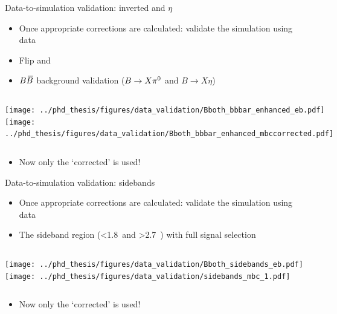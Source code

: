 \documentclass[xcolor=dvipsnames]{beamer}
\begin{document}
\begin{frame}{Data-to-simulation validation: inverted \piz and $\eta$}
   \scriptsize\centering
   \begin{itemize}
      \item Once appropriate corrections are calculated: validate the simulation using data
      \item Flip \piVeto and \etaVeto
      \item[\ra]  $B\kern 0.18em\overline{\kern -0.18em B}{}$ background validation ($B\rightarrow X \pi^0$ and $B\to X \eta$)
   \end{itemize}

   \begin{columns}
      \texttt{[image: ../phd\_thesis/figures/data\_validation/Bboth\_bbbar\_enhanced\_eb.pdf]}
      \texttt{[image: ../phd\_thesis/figures/data\_validation/Bboth\_bbbar\_enhanced\_mbccorrected.pdf]}
   \end{columns}

   \begin{itemize}
      \item Now only the `corrected' \Mbc is used!
   \end{itemize}

\end{frame}

\begin{frame}{Data-to-simulation validation: sidebands}
   \scriptsize\centering
   \begin{itemize}
      \item Once appropriate corrections are calculated: validate the simulation using data
      \item The sideband region (\EB<1.8~\gev and \EB>2.7~\gev) with full signal selection
   \end{itemize}

   \begin{columns}
      \texttt{[image: ../phd\_thesis/figures/data\_validation/Bboth\_sidebands\_eb.pdf]}
      \texttt{[image: ../phd\_thesis/figures/data\_validation/sidebands\_mbc\_1.pdf]}
   \end{columns}

   \begin{itemize}
      \item Now only the `corrected' \Mbc is used!
   \end{itemize}

\end{frame}
\end{document}
